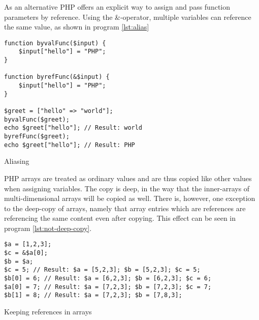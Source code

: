 As an alternative PHP offers an explicit way to assign and pass function parameters by reference. Using the \&-operator, multiple variables can reference the same value, as shown in program \ref{lst:alias}

\begin{program}
\begin{lstlisting}
function byvalFunc($input) {
    $input["hello"] = "PHP";
}

function byrefFunc(&$input) {
    $input["hello"] = "PHP";
}

$greet = ["hello" => "world"];
byvalFunc($greet);
echo $greet["hello"]; // Result: world
byrefFunc($greet);
echo $greet["hello"]; // Result: PHP
\end{lstlisting}
\caption{Aliasing}
\label{lst:alias}
\end{program}

PHP arrays are treated as ordinary values and are thus copied like other values when assigning variables. The copy is deep, in the way that the inner-arrays of multi-dimensional arrays will be copied as well. There is, however, one exception to the deep-copy of arrays, namely that array entries which are references are referencing the same content even after copying. This effect can be seen in program \ref{lst:not-deep-copy}.

\begin{program}
\begin{lstlisting}
$a = [1,2,3];
$c = &$a[0];
$b = $a;
$c = 5; // Result: $a = [5,2,3]; $b = [5,2,3]; $c = 5;
$b[0] = 6; // Result: $a = [6,2,3]; $b = [6,2,3]; $c = 6;
$a[0] = 7; // Result: $a = [7,2,3]; $b = [7,2,3]; $c = 7;
$b[1] = 8; // Result: $a = [7,2,3]; $b = [7,8,3];
\end{lstlisting}
\caption{Keeping references in arrays}
\label{lst:not-deep-copy}
\end{program}